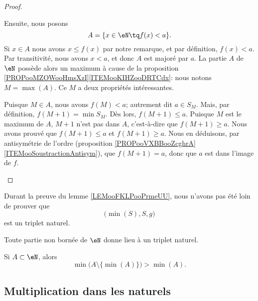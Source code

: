 \begin{proof}
\begin{subproof}
  		Ensuite, nous posons
		\begin{equation}
			A=\{ x\in \eN\tq f(x)<a \}.
		\end{equation}
  		Si \( x\in A\) nous avons \( x\leq f(x) \) par notre remarque, et par définition, \( f(x) <a\). Par transitivité, nous avons \( x < a \), et donc \( A \) est majoré par \( a \). La partie \( A\) de \( \eN\) possède alors un maximum à cause de la proposition \ref{PROPooMZOWooHmsXzI}\ref{ITEMooKIHZooDRTCdx}: nous notons \( M=\max(A)\). Ce \( M\) a deux propriétés intéressantes.
		\begin{subproof}
			\spitem[D'abord]
			Puisque \( M\in A\), nous avons \( f(M)<a\); autrement dit \( a \in S_M \). Mais, par définition, \( f(M+1)=\min S_M\). Dès lors, \( f(M+1)\leq a\).
			\spitem[Ensuite]
			Puisque \( M\) est le maximum de \( A\), \( M+1\) n'est pas dans \( A\), c'est-à-dire que \( f(M+1)\geq a\).
			Nous avons prouvé que \( f(M+1)\leq a\) et \( f(M+1)\geq a\). Nous en déduisons, par antisymétrie de l'ordre (proposition \ref{PROPooVXBBooZcghrA}\ref{ITEMooSoustractionAntisym}), que \( f(M+1)=a\), donc que \( a \) est dans l'image de \( f \).
		\end{subproof}
	\end{subproof}
\end{proof}

\begin{normaltext}      \label{NORMooQXASooMXqhjI}
	Durant la preuve du lemme \ref{LEMooFKLPooPrmeUU}, nous n'avons pas été loin de prouver que
	\begin{equation}
		\big( \min(S),S,g \big)
	\end{equation}
	est un triplet naturel.

	Toute partie non bornée de \( \eN\) donne lieu à un triplet naturel.
\end{normaltext}

\begin{lemma}	\label{LEMooLDKQooSTiVlW}
	Si \( A\subset \eN\), alors
	\begin{equation}
		\min\big( A\setminus\{ \min(A) \} \big)>\min(A).
	\end{equation}
\end{lemma}


\subsection{Multiplication dans les naturels}
\label{SUBooMultiplicationNaturels}

